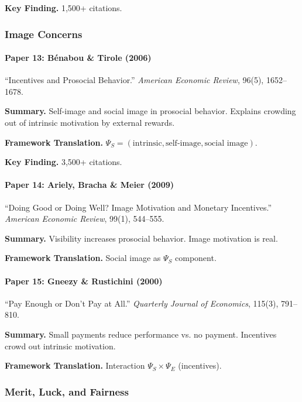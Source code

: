 \textbf{Key Finding.}
1,500+ citations.

\subsubsection{Image Concerns}

\paragraph{Paper 13: Bénabou \& Tirole (2006)}

``Incentives and Prosocial Behavior.''
\textit{American Economic Review}, 96(5), 1652--1678.

\textbf{Summary.}
Self-image and social image in prosocial behavior. Explains crowding 
out of intrinsic motivation by external rewards.

\textbf{Framework Translation.}
$\Psi_S = (\text{intrinsic}, \text{self-image}, \text{social image})$.

\textbf{Key Finding.}
3,500+ citations.

\paragraph{Paper 14: Ariely, Bracha \& Meier (2009)}

``Doing Good or Doing Well? Image Motivation and Monetary Incentives.''
\textit{American Economic Review}, 99(1), 544--555.

\textbf{Summary.}
Visibility increases prosocial behavior. Image motivation is real.

\textbf{Framework Translation.}
Social image as $\Psi_S$ component.

\paragraph{Paper 15: Gneezy \& Rustichini (2000)}

``Pay Enough or Don't Pay at All.''
\textit{Quarterly Journal of Economics}, 115(3), 791--810.

\textbf{Summary.}
Small payments reduce performance vs. no payment. Incentives crowd 
out intrinsic motivation.

\textbf{Framework Translation.}
Interaction $\Psi_S \times \Psi_E$ (incentives).

\subsubsection{Merit, Luck, and Fairness}


